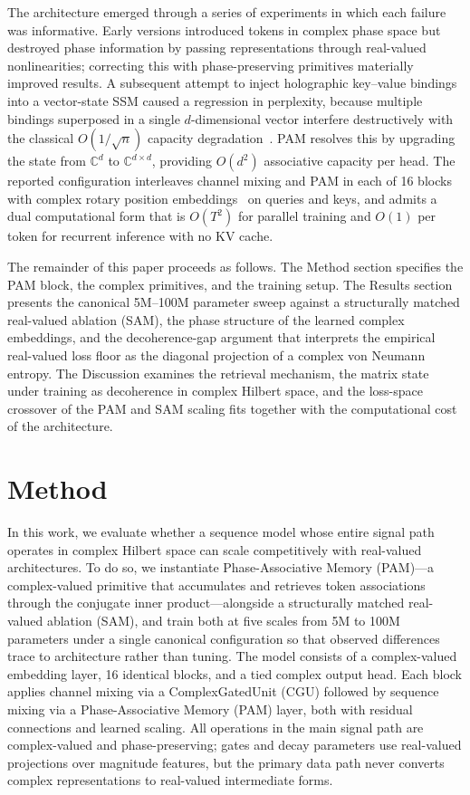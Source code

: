 \documentclass[aps,prl,twocolumn,superscriptaddress,amsmath,amssymb]{revtex4-2}
\newcommand{\Complex}{\mathbb{C}}
\begin{document}
The architecture emerged through a series of experiments in which each failure was informative. Early versions introduced tokens in complex phase space but destroyed phase information by passing representations through real-valued nonlinearities; correcting this with phase-preserving primitives materially improved results. A subsequent attempt to inject holographic key--value bindings into a vector-state SSM caused a regression in perplexity, because multiple bindings superposed in a single $d$-dimensional vector interfere destructively with the classical $O(1/\sqrt{n})$ capacity degradation~\cite{plate1995holographic}. PAM resolves this by upgrading the state from $\Complex^d$ to $\Complex^{d \times d}$, providing $O(d^2)$ associative capacity per head. The reported configuration interleaves channel mixing and PAM in each of 16 blocks with complex rotary position embeddings~\cite{su2024roformer} on queries and keys, and admits a dual computational form that is $O(T^2)$ for parallel training and $O(1)$ per token for recurrent inference with no KV cache.

The remainder of this paper proceeds as follows. The Method section specifies the PAM block, the complex primitives, and the training setup. The Results section presents the canonical 5M--100M parameter sweep against a structurally matched real-valued ablation (SAM), the phase structure of the learned complex embeddings, and the decoherence-gap argument that interprets the empirical real-valued loss floor as the diagonal projection of a complex von Neumann entropy. The Discussion examines the retrieval mechanism, the matrix state under training as decoherence in complex Hilbert space, and the loss-space crossover of the PAM and SAM scaling fits together with the computational cost of the architecture.

\section{Method}
\label{sec:method}

In this work, we evaluate whether a sequence model whose entire signal path operates in complex Hilbert space can scale competitively with real-valued architectures. To do so, we instantiate Phase-Associative Memory (PAM)---a complex-valued primitive that accumulates and retrieves token associations through the conjugate inner product---alongside a structurally matched real-valued ablation (SAM), and train both at five scales from 5M to 100M parameters under a single canonical configuration so that observed differences trace to architecture rather than tuning. The model consists of a complex-valued embedding layer, 16 identical blocks, and a tied complex output head. Each block applies channel mixing via a ComplexGatedUnit (CGU) followed by sequence mixing via a Phase-Associative Memory (PAM) layer, both with residual connections and learned scaling. All operations in the main signal path are complex-valued and phase-preserving; gates and decay parameters use real-valued projections over magnitude features, but the primary data path never converts complex representations to real-valued intermediate forms.
\end{document}

